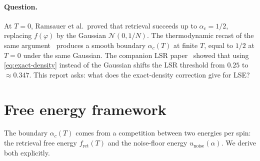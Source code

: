 \documentclass[11pt]{article}
\newcommand{\fret}{f_{\mathrm{ret}}}
\begin{document}
\paragraph{Question.}
At $T = 0$, Ramsauer et al.\ proved that retrieval succeeds up to
$\alpha_c = 1/2$, replacing $f(\varphi)$ by the Gaussian
$\mathcal{N}(0, 1/N)$.  The thermodynamic recast of the same
argument~\citep{icml2026theory} produces a smooth boundary
$\alpha_c(T)$ at finite $T$, equal to $1/2$ at $T = 0$ under the
same Gaussian.  The companion LSR paper~\citep{petrova2026metastable}
showed that using \eqref{eq:exact-density} instead of the Gaussian
shifts the LSR threshold from $0.25$ to $\approx 0.347$.  This
report asks: what does the exact-density correction give for LSE?

\section{Free energy framework}
\label{sec:framework}

The boundary $\alpha_c(T)$ comes from a competition between two
energies per spin: the retrieval free energy $\fret(T)$ and the
noise-floor energy $u_{\mathrm{noise}}(\alpha)$.  We derive both
explicitly.
\end{document}
